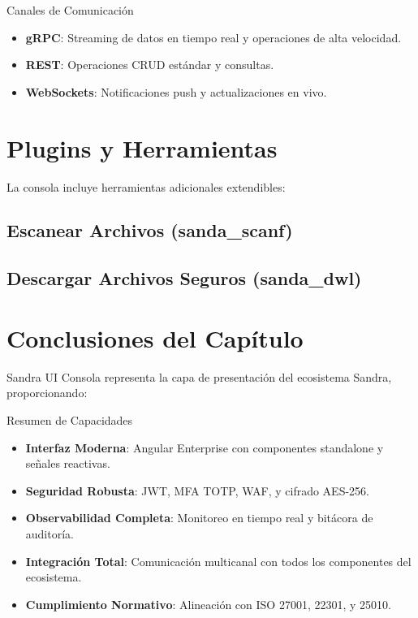 
\begin{caja}{Canales de Comunicación}
\begin{itemize}
\item \textbf{gRPC}: Streaming de datos en tiempo real y operaciones de alta velocidad.
\item \textbf{REST}: Operaciones CRUD estándar y consultas.
\item \textbf{WebSockets}: Notificaciones push y actualizaciones en vivo.
\end{itemize}
\end{caja}

\section{Plugins y Herramientas}

La consola incluye herramientas adicionales extendibles:

\subsection{Escanear Archivos (sanda\_scanf)}


\subsection{Descargar Archivos Seguros (sanda\_dwl)}


\section{Conclusiones del Capítulo}

Sandra UI Consola representa la capa de presentación del ecosistema Sandra, proporcionando:

\begin{caja}{Resumen de Capacidades}
\begin{itemize}
\item \textbf{Interfaz Moderna}: Angular Enterprise con componentes standalone y señales reactivas.
\item \textbf{Seguridad Robusta}: JWT, MFA TOTP, WAF, y cifrado AES-256.
\item \textbf{Observabilidad Completa}: Monitoreo en tiempo real y bitácora de auditoría.
\item \textbf{Integración Total}: Comunicación multicanal con todos los componentes del ecosistema.
\item \textbf{Cumplimiento Normativo}: Alineación con ISO 27001, 22301, y 25010.
\end{itemize}
\end{caja}


